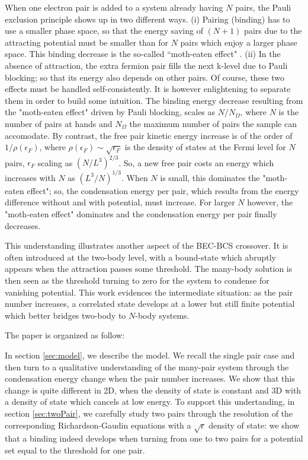 \documentclass[5p,twocolumn]{elsarticle}
\begin{document}
When one electron pair is added to a system already having $N$ pairs, the Pauli exclusion principle shows up in two different ways.  (i) Pairing (binding) has to use a smaller phase space, so that the energy saving of $(N+1)$ pairs due to the attracting potential must be smaller than for $N$ pairs which enjoy a larger phase space.  This binding decrease is the so-called ``moth-eaten effect" \cite{Pogosov and Combescot(2009)}. (ii) In the absence of attraction, the extra fermion pair fills the next k-level due to Pauli blocking; so that its energy also depends on other pairs.  Of course, these two effects must be handled self-consistently. It is however enlightening to separate them in order to build some intuition. The binding energy decrease resulting from the "moth-eaten effect" driven by Pauli blocking, scales as $N/N_\Omega$, where $N$ is the number of pairs at hands and $N_\Omega$ the maximum number of pairs the sample can accomodate. By contrast, the free pair kinetic energy increase is of the order of $1/\rho(\epsilon_F)$, where $\rho(\epsilon_F)\sim\sqrt{\epsilon_F}$ is the density of states at the Fermi level for $N$ pairs, $\epsilon_F$ scaling as $(N/L^3)^{2/3}$. So, a new free pair costs an energy which increases with $N$ as $(L^3/N)^{1/3}$. When $N$ is small, this dominates the "moth-eaten effect"; so, the condensation energy per pair, which results from the energy difference without and with potential, must increase.  For larger $N$ however, the "moth-eaten effect" dominates and the condensation energy per pair finally decreases.

This understanding illustrates another aspect of the BEC-BCS crossover.  It is often introduced at the two-body level, with a bound-state which abruptly appears when the attraction passes some threshold. The many-body solution is then seen as the threshold turning to zero for the system to condense for vanishing potential. This work evidences the intermediate situation: as the pair number increases, a correlated state develops at a lower but still finite potential which better bridges two-body to $N$-body systems. 

The paper is organized as follow:

In section \ref{sec:model}, we describe the model. We recall the single pair case and then turn to a qualitative understanding of the many-pair system through the condensation energy change when the pair number increases. We show that this change is quite different in 2D, when the density of state is constant and 3D  with a density of state which cancels at low energy.  To support this undertanding, in section \ref{sec:twoPair}, we carefully study two pairs through the resolution of the corresponding  Richardson-Gaudin equations with a $\sqrt{\epsilon}$ density of state: we show that a binding indeed develops when turning from one to two pairs for a potential set equal to the threshold for one pair.
\end{document}
